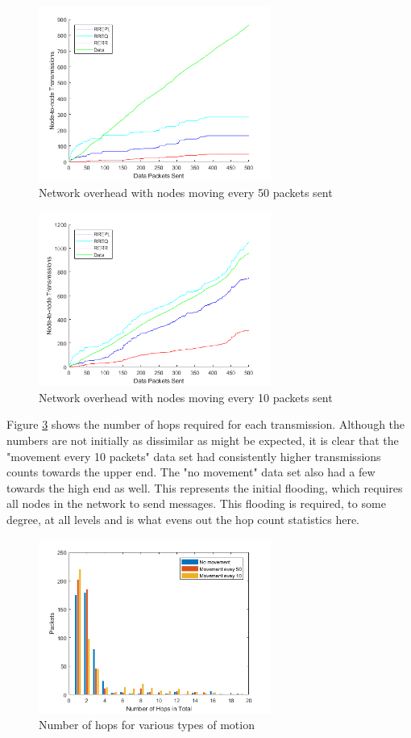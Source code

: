 \documentclass[conference]{IEEEtran}
\begin{document}
\begin{figure}[ht]
	\centering
	\includegraphics[width=3in]{movement_50.png}
	\caption{Network overhead with nodes moving every 50 packets sent}
	\label{fig:movement_50}
\end{figure}

\begin{figure}[ht]
	\centering
	\includegraphics[width=3in]{movement_10.png}
	\caption{Network overhead with nodes moving every 10 packets sent}
	\label{fig:movement_10}
\end{figure}

Figure \ref{fig:hops} shows the number of hops required for each transmission. Although the numbers are not initially as dissimilar as might be expected, it is clear that the "movement every 10 packets" data set had consistently higher transmissions counts towards the upper end. The "no movement" data set also had a few towards the high end as well. This represents the initial flooding, which requires all nodes in the network to send messages. This flooding is required, to some degree, at all levels and is what evens out the hop count statistics here.

\begin{figure}[ht]
	\centering
	\includegraphics[width=3in]{hops_overall.png}
	\caption{Number of hops for various types of motion}
	\label{fig:hops}
\end{figure}
\end{document}
